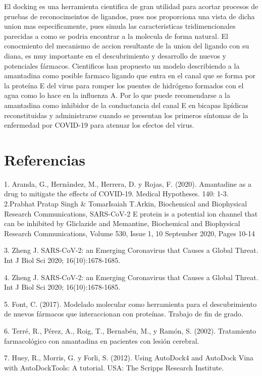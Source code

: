 \documentclass[12pt]{article}
\begin{document}
El docking es una herramienta cientifica de gran utilidad para acortar procesos de pruebas de reconocimeintos de ligandos, pues nos proporciona una vista de dicha union mas especificamente, pues simula las caracteristicas tridimencionales parecidas a como  se podria encontrar a la molecula de forma natural. El conocmiento del mecanismo de accion resultante de la union del ligando con su diana, es muy importante en el descubrimiento y desarrollo de nuevos y potenciales fármacos. Cientificos  han propuesto un modelo describiendo a la amantadina como posible farmaco ligando que entra en el canal que se forma por la proteína E del virus para romper los puentes de hidrógeno formados con el agua como lo hace en la influenza A. Por lo que puede recomendarse a la amantadina como inhibidor de la conductancia del canal E en bicapas lipídicas reconstituidas y administrarse cuando se presentan los primeros síntomas de la enfermedad por COVID-19 para atenuar los efectos del virus. 



\section{Referencias}
\label{chap:Referencias}
1. Aranda, G., Hernández, M., Herrera, D. y Rojas, F. (2020). Amantadine as a drug to mitigate the effects of COVID-19. Medical Hypotheses. 140: 1-3. 
2.Prabhat Pratap Singh & TomarIsaiah T.Arkin, Biochemical and Biophysical Research Communications, SARS-CoV-2 E protein is a potential ion channel that can be inhibited by Gliclazide and Memantine, Biochemical and Biophysical Research Communications, Volume 530, Issue 1, 10 September 2020, Pages 10-14

3. Zheng J. SARS-CoV-2: an Emerging Coronavirus that Causes a Global Threat. Int J Biol Sci 2020; 16(10):1678-1685. 

4. Zheng J. SARS-CoV-2: an Emerging Coronavirus that Causes a Global Threat. Int J Biol Sci 2020; 16(10):1678-1685. 

5. Font, C. (2017). Modelado molecular como herramienta para el descubrimiento de nuevos fármacos que interaccionan con proteínas. Trabajo de fin de grado. 

6. Terré, R., Pérez, A., Roig, T., Bernabéu, M., y Ramón, S. (2002). Tratamiento farmacológico con amantadina en pacientes con lesión cerebral. 

7. Huey, R., Morris, G. y Forli, S. (2012). Using AutoDock4 and AutoDock Vina with AutoDockTools: A tutorial. USA: The Scripps Research Institute. 
\end{document}

